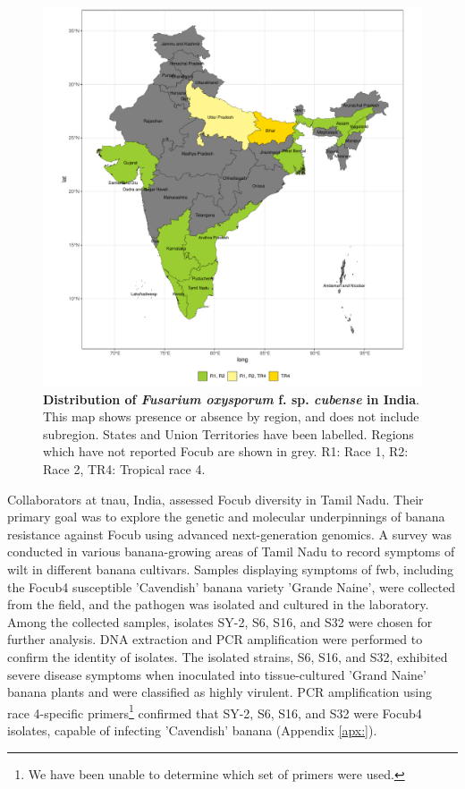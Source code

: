 \begin{figure}[hp!]
  \includegraphics[width=15cm]{Figures/FocDis_India.pdf}
  \caption[Distribution of \textit{Fusarium oxysporum} f. sp. \textit{cubense} in India]{\textbf{ Distribution of \textit{Fusarium oxysporum} f. sp. \textit{cubense} in India}. This map shows presence or absence by region, and does not include subregion. States and Union Territories have been labelled. Regions which have not reported \ac{Focub} are shown in grey. R1: Race 1, R2: Race 2, TR4: Tropical race 4.}
  \label{fig:FocDisIndia}
\end{figure}

Collaborators at \ac{tnau}, India, assessed \ac{Focub} diversity in Tamil Nadu. Their primary goal was to explore the genetic and molecular underpinnings of banana resistance against \ac{Focub} using advanced next-generation genomics. A survey was conducted in various banana-growing areas of Tamil Nadu to record symptoms of wilt in different banana cultivars. Samples displaying symptoms of \ac{fwb}, including the \ac{Focub4} susceptible 'Cavendish' banana variety 'Grande Naine', were collected from the field, and the pathogen was isolated and cultured in the laboratory. Among the collected samples, isolates SY-2, S6, S16, and S32 were chosen for further analysis. DNA extraction and PCR amplification were performed to confirm the identity of isolates. The isolated strains, S6, S16, and S32, exhibited severe disease symptoms when inoculated into tissue-cultured 'Grand Naine' banana plants and were classified as highly virulent. PCR amplification using race 4-specific primers\footnote{We have been unable to determine which set of primers were used.} confirmed that SY-2, S6, S16, and S32 were \ac{Focub4} isolates, capable of infecting 'Cavendish' banana (Appendix \ref{apx:}).

